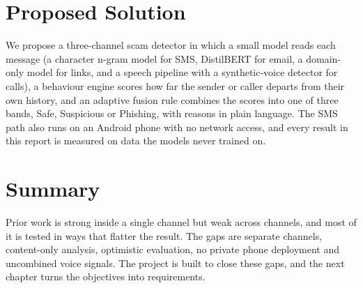 {\section{Proposed Solution}
We propose a three-channel scam detector in which a small model reads each message (a character n-gram model for SMS, DistilBERT for email, a domain-only model for links, and a speech pipeline with a synthetic-voice detector for calls), a behaviour engine scores how far the sender or caller departs from their own history, and an adaptive fusion rule combines the scores into one of three bands, Safe, Suspicious or Phishing, with reasons in plain language. The SMS path also runs on an Android phone with no network access, and every result in this report is measured on data the models never trained on.

\section{Summary}
Prior work is strong inside a single channel but weak across channels, and most of it is tested in ways that flatter the result. The gaps are separate channels, content-only analysis, optimistic evaluation, no private phone deployment and uncombined voice signals. The project is built to close these gaps, and the next chapter turns the objectives into requirements.

}

